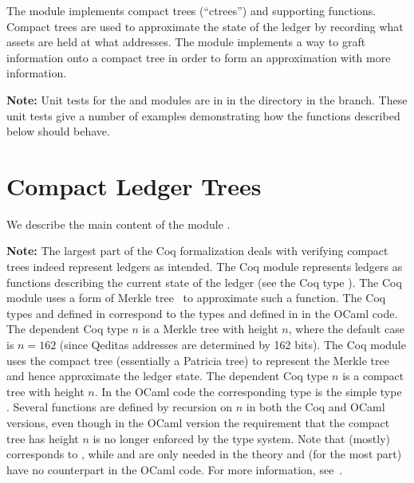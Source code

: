 The {} module
implements compact trees (``ctrees'')
and supporting functions.
Compact trees are used to approximate the state of the ledger
by recording what assets are held at what addresses.
The {} module
implements a way to graft information onto a compact
tree in order to form an approximation with more information.

{\bf{Note:}} Unit tests for the {} and {} modules are in {}
in the {}
directory in the {} branch.
These unit tests give a number of examples demonstrating how the functions described below should behave.

\section{Compact Ledger Trees}

We describe the main content of the module {}.

{\bf{Note:}} The largest part of the Coq formalization deals with verifying compact trees
indeed represent ledgers as intended.
The Coq module {} represents ledgers as functions
describing the current state of the ledger (see the Coq type ).
The Coq module {} uses a form of Merkle tree~\cite{Merkle1980} to approximate such a
{} function.
The Coq types {} and {} defined in {} correspond to 
the types {} and {} defined in {} in the OCaml code.
The dependent Coq type {} $n$ is a Merkle tree with height $n$,
where the default case is $n=162$ (since Qeditas addresses are determined by 162 bits).
The Coq module {} uses the compact tree (essentially a Patricia tree)
to represent the Merkle tree and hence approximate the ledger state.
The dependent Coq type {} $n$ is a compact tree with height $n$.
In the OCaml code the corresponding type is the simple type {}.
Several functions are defined by recursion on $n$ in both the Coq and OCaml versions,
even though in the OCaml version the requirement that the compact tree has height $n$
is no longer enforced by the type system.
Note that {} (mostly) corresponds to {},
while {} and {} are only needed in the theory
and (for the most part) have no counterpart in the OCaml code.
For more information, see~\cite{White2015b}.

